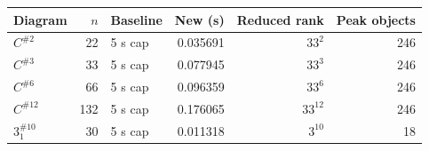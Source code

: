 \begin{center}
\small
\begin{tabular}{lrlrrr}
\toprule
Diagram & $n$ & Baseline & New (s) & Reduced rank & Peak objects \\
\midrule
$C^{\# 2}$ & 22 & 5 s cap & 0.035691 & $33^{2}$ & 246 \\
$C^{\# 3}$ & 33 & 5 s cap & 0.077945 & $33^{3}$ & 246 \\
$C^{\# 6}$ & 66 & 5 s cap & 0.096359 & $33^{6}$ & 246 \\
$C^{\# 12}$ & 132 & 5 s cap & 0.176065 & $33^{12}$ & 246 \\
$3_1^{\# 10}$ & 30 & 5 s cap & 0.011318 & $3^{10}$ & 18 \\
\bottomrule
\end{tabular}
\end{center}
